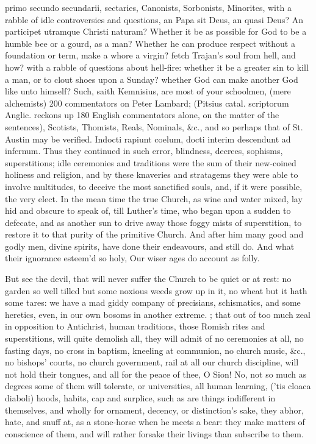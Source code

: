 {primo secundo secundarii, sectaries, Canonists, Sorbonists, Minorites,
with a rabble of idle controversies and questions, an Papa sit
Deus, an quasi Deus? An participet utramque Christi naturam? Whether it
be as possible for God to be a humble bee or a gourd, as a man? Whether
he can produce respect without a foundation or term, make a whore a
virgin? fetch Trajan's soul from hell, and how? with a rabble of
questions about hell-fire: whether it be a greater sin to kill a man,
or to clout shoes upon a Sunday? whether God can make another God like
unto himself? Such, saith Kemnisius, are most of your schoolmen, (mere
alchemists) 200 commentators on Peter Lambard; (Pitsius catal.
scriptorum Anglic. reckons up 180 English commentators alone, on the
matter of the sentences), Scotists, Thomists, Reals, Nominals, \&c., and
so perhaps that of St. Austin may be verified. Indocti rapiunt
coelum, docti interim descendunt ad infernum. Thus they continued in
such error, blindness, decrees, sophisms, superstitions; idle
ceremonies and traditions were the sum of their new-coined holiness and
religion, and by these knaveries and stratagems they were able to
involve multitudes, to deceive the most sanctified souls, and, if it
were possible, the very elect. In the mean time the true Church, as
wine and water mixed, lay hid and obscure to speak of, till Luther's
time, who began upon a sudden to defecate, and as another sun to drive
away those foggy mists of superstition, to restore it to that purity of
the primitive Church. And after him many good and godly men, divine
spirits, have done their endeavours, and still do.
And what their ignorance esteem'd so holy,
Our wiser ages do account as folly.

But see the devil, that will never suffer the Church to be quiet or at
rest: no garden so well tilled but some noxious weeds grow up in it, no
wheat but it hath some tares: we have a mad giddy company of
precisians, schismatics, and some heretics, even, in our own bosoms in
another extreme. ;
that out of too much zeal in opposition to Antichrist, human
traditions, those Romish rites and superstitions, will quite demolish
all, they will admit of no ceremonies at all, no fasting days, no cross
in baptism, kneeling at communion, no church music, \&c., no bishops'
courts, no church government, rail at all our church discipline, will
not hold their tongues, and all for the peace of thee, O Sion! No, not
so much as degrees some of them will tolerate, or universities, all
human learning, ('tis cloaca diaboli) hoods, habits, cap and surplice,
such as are things indifferent in themselves, and wholly for ornament,
decency, or distinction's sake, they abhor, hate, and snuff at, as a
stone-horse when he meets a bear: they make matters of conscience of
them, and will rather forsake their livings than subscribe to them.

}
